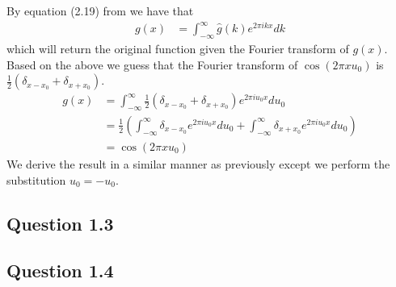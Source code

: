 \documentclass[a4paper, 10pt, final]{article}
\begin{document}
By equation (2.19) from \citeauthor{jahne-digital} we have that
\begin{align*}
    g(x) & = \int_{-\infty}^{\infty}{\hat{g}(k)e^{2\pi ikx}dk}
\end{align*}
which will return the original function given the Fourier transform of
$g(x)$. Based on the above we guess that the Fourier transform of
$\cos(2\pi xu_0)$ is $\frac{1}{2}(\delta_{x - x_0} + \delta_{x + x_0})$.
\begin{align*}
    g(x) & = \int_{-\infty}^{\infty}{\frac{1}{2}(\delta_{x - x_0} +
    \delta_{x + x_0})e^{2\pi iu_0x}du_0}\\
    & = \frac{1}{2}\left( \int_{-\infty}^{\infty}{\delta_{x -
    x_0}e^{2\pi iu_0x}du_0} + \int_{-\infty}^{\infty}{\delta_{x +
    x_0}e^{2\pi iu_0x}du_0}\right)\\
    & = \cos(2\pi xu_0)
\end{align*}
We derive the result in a similar manner as previously except we
perform the substitution $u_0 = - u_0$.

\subsection*{Question 1.3}

\subsection*{Question 1.4}



\end{document}
